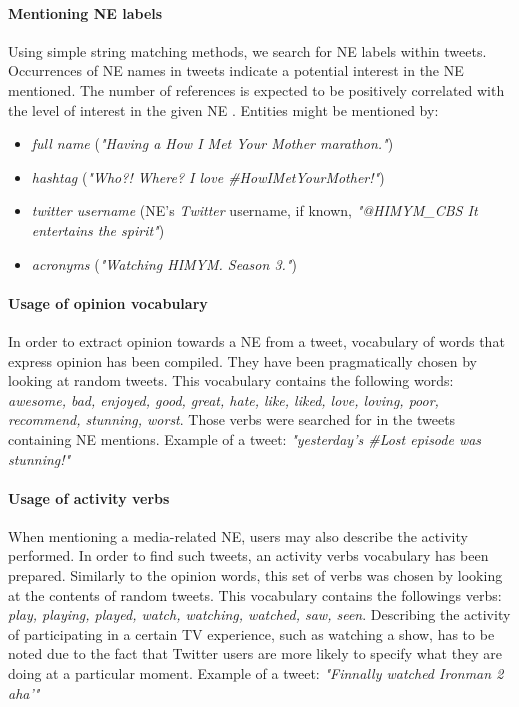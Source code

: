 \paragraph{Mentioning NE labels}
Using simple string matching methods, we search for NE labels within tweets.
Occurrences of NE names in tweets indicate a potential interest in the NE mentioned. The
number of references is expected to be positively correlated with the level of interest in the given NE \cite{twitter-content-is-it}.
Entities might be mentioned by:
\begin{itemize}
  \item \textit{full name} (\eg \textit{"Having a How I Met Your Mother marathon."})
  \item \textit{hashtag} (\eg \textit{"Who?! Where? I love \#HowIMetYourMother!"})
  \item \textit{twitter username} (NE's \textit{Twitter} username, if known, \eg \textit{"@HIMYM\_CBS It entertains the spirit"})
  \item \textit{acronyms} (\eg \textit{"Watching HIMYM. Season 3."})
\end{itemize}
\paragraph{Usage of opinion vocabulary}
In order to extract opinion towards a NE from a tweet, vocabulary of words that express
opinion has been compiled. They have been pragmatically chosen by looking at random tweets.
This vocabulary contains the following words: \textit{awesome, bad, enjoyed, good, great, hate,
like, liked, love, loving, poor, recommend, stunning, worst}.
Those verbs were searched for in the tweets containing NE mentions.
Example of a tweet: \textit{"yesterday's \#Lost episode was stunning!"}
\paragraph{Usage of activity verbs}
When mentioning a media-related NE, users may also describe the activity performed.
In order to find such tweets, an activity verbs vocabulary has been prepared. Similarly to
the opinion words, this set of verbs was chosen by looking at the contents of random tweets.
This vocabulary contains the followings verbs: \textit{play, playing, played, watch, watching, watched,
saw, seen}.
Describing the activity of participating in a certain TV experience, such
as watching a show, has to be noted due to the fact that Twitter users are more
likely to specify what they are doing at a particular moment.
Example of a tweet: \textit{"Finnally watched Ironman 2 aha'"}

